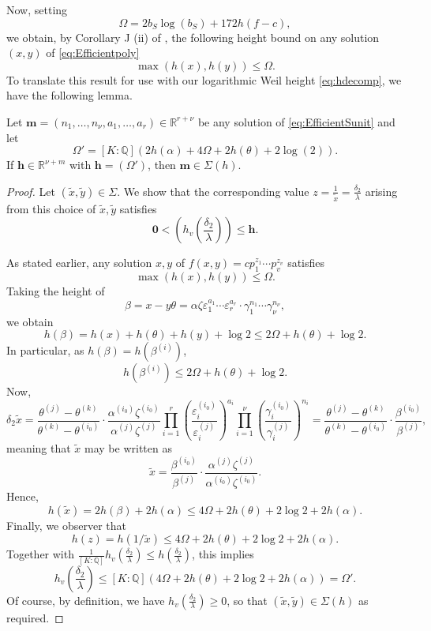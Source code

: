 Now, setting
\[\Omega = 2b_S \log(b_S) + 172h(f-c),\]
we obtain, by Corollary J (ii) of \cite{KanMat}, the following height bound on any solution $(x,y)$ of \eqref{eq:Efficientpoly}
\[\max(h(x),h(y))\leq \Omega.\]
To translate this result for use with our logarithmic Weil height \eqref{eq:hdecomp}, we have the following lemma. 
\begin{lemma} \label{lem:TMinitialheight}
Let ${\mathbf{m} = (n_1, \dots, n_{\nu}, a_1, \dots, a_r) \in \mathbb{R}^{r + \nu}}$ be any solution of \eqref{eq:EfficientSunit} and let 
\begin{equation} \label{eq:Omegaprime}
\Omega' = [K:\mathbb{Q}](2h(\alpha) + 4\Omega + 2h(\theta) + 2\log(2)).
\end{equation}
If $\mathbf{h} \in\mathbb{R}^{\nu + m}$ with $\mathbf{h} = (\Omega')$, then $\mathbf{m}\in \Sigma(h)$.
\end{lemma}

\begin{proof}
Let $(\tilde{x},\tilde{y}) \in \Sigma$. We show that the corresponding value $z = \frac{1}{\tilde{x}} = \frac{\delta_2}{\lambda}$ arising from this choice of $\tilde{x},\tilde{y}$ satisfies
\[\mathbf{0} < \left(h_v\left(\frac{\delta_2}{\lambda}\right)\right)\leq \mathbf{h}.\]

As stated earlier, any solution $x,y$ of $f(x,y) = c p_1^{z_1}\cdots p_v^{z_v}$ satisfies
\[\max(h(x),h(y)) \leq \Omega.\]
Taking the height of 
\[\beta = x-y\theta = \alpha \zeta \varepsilon_1^{a_1} \cdots \varepsilon_r^{a_r}\cdot \gamma_1^{n_1}\cdots \gamma_{\nu}^{n_{\nu}},\]
we obtain
\[h(\beta) = h(x) + h(\theta) + h(y) + \log{2}  \leq 2\Omega + h(\theta) + \log{2}.\]
In particular, as $h(\beta) = h(\beta^{(i)})$, 
\[h(\beta^{(i)}) \leq 2\Omega + h(\theta) + \log{2}.\]
Now, 
\[\delta_2\tilde{x} 
	= \frac{\theta^{(j)} - \theta^{(k)}}{\theta^{(k)} - \theta^{(i_0)}}\cdot \frac{\alpha^{(i_0)}\zeta^{(i_0)}}{\alpha^{(j)}\zeta^{(j)}} \prod_{i = 1}^{r}\left( \frac{\varepsilon_i^{(i_0)}}{\varepsilon_i^{(j)}}\right)^{a_i} \prod_{i = 1}^{\nu} \left( \frac{\gamma_i^{(i_0)}}{\gamma_i^{(j)}}\right)^{n_i}  
	= \frac{\theta^{(j)} - \theta^{(k)}}{\theta^{(k)} - \theta^{(i_0)}}\cdot \frac{\beta^{(i_0)}}{\beta^{(j)}},\]
meaning that $\tilde{x}$ may be written as
\[\tilde{x} =\frac{\beta^{(i_0)}}{\beta^{(j)}}\cdot \frac{\alpha^{(j)}\zeta^{(j)}}{\alpha^{(i_0)}\zeta^{(i_0)}}.\]
Hence, 
\[h(\tilde{x})	 = 2h(\beta) + 2h(\alpha) \leq 4\Omega + 2h(\theta) + 2\log{2} + 2h(\alpha).\]
Finally, we observer that 
\[h(z) = h(1/\tilde{x}) \leq 4\Omega + 2h(\theta) + 2\log{2} + 2h(\alpha).\]
Together with $\displaystyle \frac{1}{[K:\mathbb{Q}]}h_v\left(\frac{\delta_2}{\lambda}\right) \leq h\left(\frac{\delta_2}{\lambda}\right)$, this implies
\[h_v\left(\frac{\delta_2}{\lambda}\right) \leq [K:\mathbb{Q}]\left(4\Omega + 2h(\theta) + 2\log{2} + 2h(\alpha)\right) = \Omega'.\]
Of course, by definition, we have $h_v\left(\frac{\delta_2}{\lambda}\right) \geq 0$, so that $(\tilde{x},\tilde{y}) \in \Sigma(h)$ as required. 
\end{proof}

